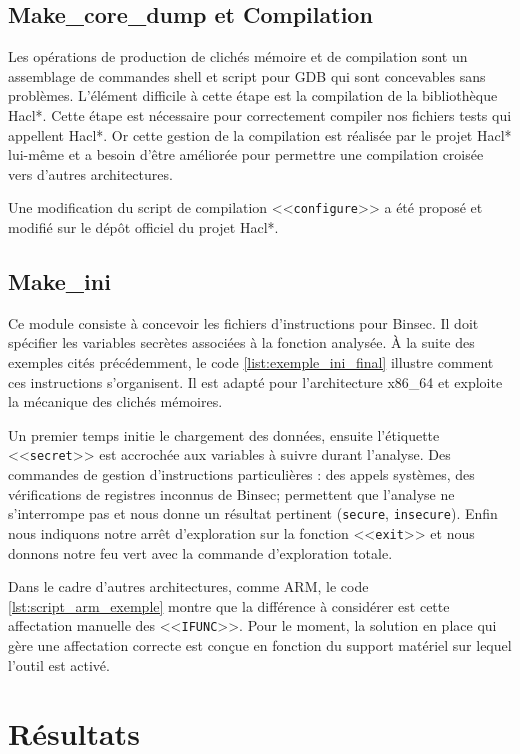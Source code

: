 \subsection*{Make\_core\_dump et Compilation}

Les opérations de production de clichés mémoire et de compilation sont un assemblage de commandes shell et script pour GDB qui sont concevables sans problèmes. L'élément difficile à cette étape est la compilation de la bibliothèque Hacl*. Cette étape est nécessaire pour correctement compiler nos fichiers tests qui appellent Hacl*. Or cette gestion de la compilation est réalisée par le projet Hacl* lui-même et a besoin d'être améliorée pour permettre une compilation croisée vers d'autres architectures.\smallbreak

Une modification du script de compilation <<\texttt{configure}>> a été proposé et modifié sur le dépôt officiel du projet Hacl*.

\subsection*{Make\_ini}

Ce module consiste à concevoir les fichiers d'instructions pour Binsec. Il doit spécifier les variables secrètes associées à la fonction analysée. À la suite des exemples cités précédemment, le code \ref{list:exemple_ini_final} illustre comment ces instructions s'organisent. Il est adapté pour l'architecture x86\_64 et exploite la mécanique des clichés mémoires.\smallbreak

Un premier temps initie le chargement des données, ensuite l'étiquette <<\texttt{secret}>> est accrochée aux variables à suivre durant l'analyse. Des commandes de gestion d'instructions particulières : des appels systèmes, des vérifications de registres inconnus de Binsec; permettent que l'analyse ne s'interrompe pas et nous donne un résultat pertinent (\texttt{secure}, \texttt{insecure}). Enfin nous indiquons notre arrêt d'exploration sur la fonction <<\texttt{exit}>> et nous donnons notre feu vert avec la commande d'exploration totale.\medbreak

Dans le cadre d'autres architectures, comme ARM, le code \ref{lst:script_arm_exemple} montre que la différence à considérer est cette affectation manuelle des <<\texttt{IFUNC}>>. Pour le moment, la solution en place qui gère une affectation correcte est conçue en fonction du support matériel sur lequel l'outil est activé.

\section{Résultats}

